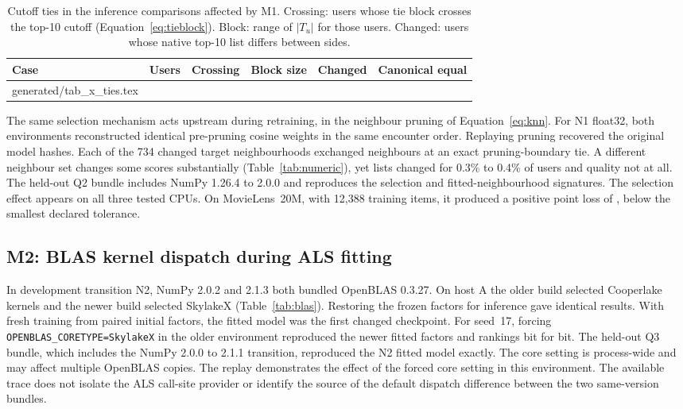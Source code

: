 \documentclass[11pt,a4paper]{article}
\makeatletter
\newcommand{\tablebody}[1]{\@@input generated/#1.tex }
\makeatother
\begin{document}
\begin{table}[htbp]
  \centering\small
  \caption{Cutoff ties in the inference comparisons affected by M1. Crossing:
    users whose tie block crosses the top-10 cutoff (Equation~\ref{eq:tieblock}).
    Block: range of $|T_u|$ for those users. Changed: users whose native
    top-10 list differs between sides.}
  \label{tab:ties}
  \begin{tabular}{@{}lrrrrc@{}}
    \toprule
    Case & Users & Crossing & Block size & Changed & Canonical equal \\
    \midrule
    \tablebody{tab_x_ties}
    \bottomrule
  \end{tabular}
\end{table}

The same selection mechanism acts upstream during retraining, in the
neighbour pruning of Equation~\eqref{eq:knn}. For N1 float32, both
environments reconstructed identical pre-pruning cosine weights in the same
encounter order. Replaying pruning recovered the original model hashes. Each
of the 734 changed target neighbourhoods exchanged neighbours at an exact
pruning-boundary tie. A different neighbour set changes some scores
substantially (Table~\ref{tab:numeric}), yet lists changed for 0.3\% to 0.4\%
of users and quality not at all. The held-out Q2 bundle includes NumPy 1.26.4
to 2.0.0 and reproduces the selection and fitted-neighbourhood signatures.
The selection effect appears on all three tested CPUs. On MovieLens~20M, with
12{,}388 training items, it produced a positive point loss of
\lossMOneMLtwenty{}, below the smallest declared tolerance.

\subsection{M2: BLAS kernel dispatch during ALS fitting}

In development transition N2, NumPy 2.0.2 and 2.1.3 both bundled OpenBLAS
0.3.27. On host A the older build selected Cooperlake kernels and the
newer build selected SkylakeX (Table~\ref{tab:blas}). Restoring the frozen
factors for inference gave identical results. With fresh training from paired
initial factors, the fitted model was the first changed checkpoint. For
seed~17, forcing \texttt{OPENBLAS\_CORETYPE=SkylakeX} in the older environment
reproduced the newer fitted factors and rankings bit for bit. The held-out Q3
bundle, which includes the NumPy 2.0.0 to 2.1.1 transition, reproduced the N2
fitted model exactly. The core setting is process-wide and may affect
multiple OpenBLAS copies. The replay demonstrates the effect of the forced
core setting in this environment. The available trace does not isolate the
ALS call-site provider or identify the source of the default dispatch
difference between the two same-version bundles.
\end{document}
